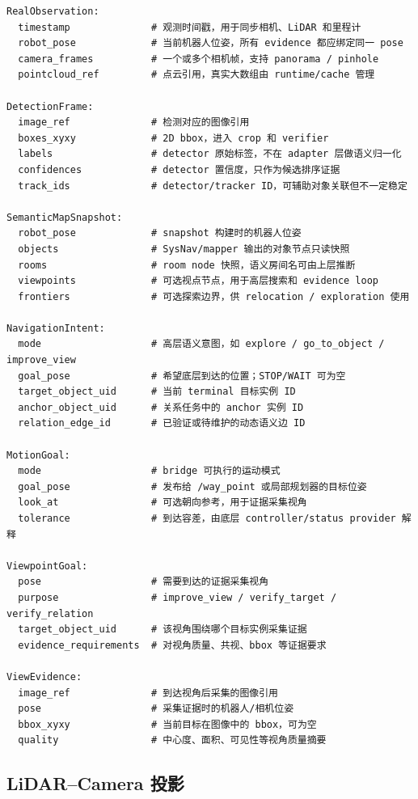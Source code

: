 \documentclass[UTF8,zihao=-4]{ctexart}
\begin{document}
\begin{lstlisting}[style=pseudo,caption={Real-robot contract 摘要}]
RealObservation:
  timestamp              # 观测时间戳，用于同步相机、LiDAR 和里程计
  robot_pose             # 当前机器人位姿，所有 evidence 都应绑定同一 pose
  camera_frames          # 一个或多个相机帧，支持 panorama / pinhole
  pointcloud_ref         # 点云引用，真实大数组由 runtime/cache 管理

DetectionFrame:
  image_ref              # 检测对应的图像引用
  boxes_xyxy             # 2D bbox，进入 crop 和 verifier
  labels                 # detector 原始标签，不在 adapter 层做语义归一化
  confidences            # detector 置信度，只作为候选排序证据
  track_ids              # detector/tracker ID，可辅助对象关联但不一定稳定

SemanticMapSnapshot:
  robot_pose             # snapshot 构建时的机器人位姿
  objects                # SysNav/mapper 输出的对象节点只读快照
  rooms                  # room node 快照，语义房间名可由上层推断
  viewpoints             # 可选视点节点，用于高层搜索和 evidence loop
  frontiers              # 可选探索边界，供 relocation / exploration 使用

NavigationIntent:
  mode                   # 高层语义意图，如 explore / go_to_object / improve_view
  goal_pose              # 希望底层到达的位置；STOP/WAIT 可为空
  target_object_uid      # 当前 terminal 目标实例 ID
  anchor_object_uid      # 关系任务中的 anchor 实例 ID
  relation_edge_id       # 已验证或待维护的动态语义边 ID

MotionGoal:
  mode                   # bridge 可执行的运动模式
  goal_pose              # 发布给 /way_point 或局部规划器的目标位姿
  look_at                # 可选朝向参考，用于证据采集视角
  tolerance              # 到达容差，由底层 controller/status provider 解释

ViewpointGoal:
  pose                   # 需要到达的证据采集视角
  purpose                # improve_view / verify_target / verify_relation
  target_object_uid      # 该视角围绕哪个目标实例采集证据
  evidence_requirements  # 对视角质量、共视、bbox 等证据要求

ViewEvidence:
  image_ref              # 到达视角后采集的图像引用
  pose                   # 采集证据时的机器人/相机位姿
  bbox_xyxy              # 当前目标在图像中的 bbox，可为空
  quality                # 中心度、面积、可见性等视角质量摘要
\end{lstlisting}

\subsection{LiDAR--Camera 投影}
\end{document}
